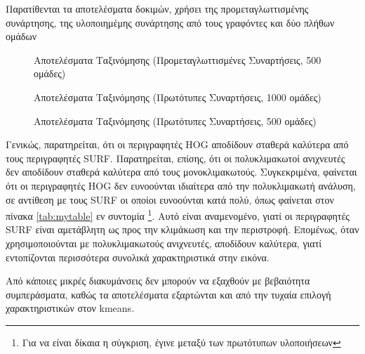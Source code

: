 \documentclass{article}
\newcommand{\eng}[1]{\foreignlanguage{english}{#1}}
\begin{document}
Παρατίθενται τα αποτελέσματα δοκιμών, χρήσει της προμεταγλωττισμένης συνάρτησης, της υλοποιημέμης συνάρτησης από τους γραφόντες και δύο πλήθων ομάδων

\begin{figure}[h]
    
    \caption{Αποτελέσματα Ταξινόμησης (Προμεταγλωττισμένες Συναρτήσεις, 500 ομάδες)}
\end{figure}
\FloatBarrier

\begin{figure}[h]
    
    \caption{Αποτελέσματα Ταξινόμησης (Πρωτότυπες Συναρτήσεις, 1000 ομάδες)}
\end{figure}
\FloatBarrier

\begin{figure}[h]
    
    \caption{Αποτελέσματα Ταξινόμησης (Πρωτότυπες Συναρτήσεις, 500 ομάδες)}
\end{figure}
\FloatBarrier

Γενικώς, παρατηρείται, ότι οι περιγραφητές \eng{HOG} αποδίδουν σταθερά καλύτερα από τους περιγραφητές \eng{SURF}. Παρατηρείται, επίσης, ότι οι πολυκλιμακωτοί ανιχνευτές δεν αποδίδουν σταθερά καλύτερα από τους μονοκλιμακωτούς. Συγκεκριμένα, φαίνεται ότι οι περιγραφητές \eng{HOG} δεν ευνοούνται ιδιαίτερα από την πολυκλιμακωτή ανάλυση, σε αντίθεση με τους \eng{SURF} οι οποίοι ευνοούνται κατά πολύ, όπως φαίνεται στον πίνακα \ref{tab:mytable} εν συντομία \footnote{Για να είναι δίκαια η σύγκριση, έγινε μεταξύ των πρωτότυπων υλοποιήσεων}. Αυτό είναι αναμενομένο, γιατί οι περιγραφητές \eng{SURF} είναι αμετάβλητη ως προς την κλιμάκωση και την περιστροφή. Επομένως, όταν χρησιμοποιούνται με πολυκλιμακωτούς ανιχνευτές, αποδίδουν καλύτερα, γιατί εντοπίζονται περισσότερα συνολικά χαρακτηριστικά στην εικόνα.

Από κάποιες μικρές διακυμάνσεις δεν μπορούν να εξαχθούν με βεβαιότητα συμπεράσματα, καθώς τα αποτελέσματα εξαρτώνται και από την τυχαία επιλογή χαρακτηριστικών στον kmeans.
\end{document}
